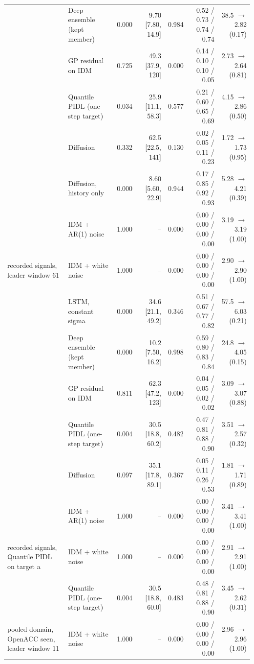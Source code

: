 \begin{longtable}{llrrrrr}
 & Deep ensemble (kept member) & 0.000 & 9.70 [7.80, 14.9] & 0.984 & 0.52 / 0.73 / 0.74 / 0.74 & 38.5 $\rightarrow$ 2.82 (0.17) \\
 & GP residual on IDM & 0.725 & 49.3 [37.9, 120] & 0.000 & 0.14 / 0.10 / 0.10 / 0.05 & 2.73 $\rightarrow$ 2.64 (0.81) \\
 & Quantile PIDL (one-step target) & 0.034 & 25.9 [11.1, 58.3] & 0.577 & 0.21 / 0.60 / 0.65 / 0.69 & 4.15 $\rightarrow$ 2.86 (0.50) \\
 & Diffusion & 0.332 & 62.5 [22.5, 141] & 0.130 & 0.02 / 0.05 / 0.11 / 0.23 & 1.72 $\rightarrow$ 1.73 (0.95) \\
 & Diffusion, history only & 0.000 & 8.60 [5.60, 22.9] & 0.944 & 0.17 / 0.85 / 0.92 / 0.93 & 5.28 $\rightarrow$ 4.21 (0.39) \\
 & IDM + AR(1) noise & 1.000 & -- & 0.000 & 0.00 / 0.00 / 0.00 / 0.00 & 3.19 $\rightarrow$ 3.19 (1.00) \\
\midrule
recorded signals, leader window 61 & IDM + white noise & 1.000 & -- & 0.000 & 0.00 / 0.00 / 0.00 / 0.00 & 2.90 $\rightarrow$ 2.90 (1.00) \\
 & LSTM, constant sigma & 0.000 & 34.6 [21.1, 49.2] & 0.346 & 0.51 / 0.67 / 0.77 / 0.82 & 57.5 $\rightarrow$ 6.03 (0.21) \\
 & Deep ensemble (kept member) & 0.000 & 10.2 [7.50, 16.2] & 0.998 & 0.59 / 0.80 / 0.83 / 0.84 & 24.8 $\rightarrow$ 4.05 (0.15) \\
 & GP residual on IDM & 0.811 & 62.3 [47.2, 123] & 0.000 & 0.04 / 0.05 / 0.02 / 0.02 & 3.09 $\rightarrow$ 3.07 (0.88) \\
 & Quantile PIDL (one-step target) & 0.004 & 30.5 [18.8, 60.2] & 0.482 & 0.47 / 0.81 / 0.88 / 0.90 & 3.51 $\rightarrow$ 2.57 (0.32) \\
 & Diffusion & 0.097 & 35.1 [17.8, 89.1] & 0.367 & 0.05 / 0.11 / 0.26 / 0.53 & 1.81 $\rightarrow$ 1.71 (0.89) \\
 & IDM + AR(1) noise & 1.000 & -- & 0.000 & 0.00 / 0.00 / 0.00 / 0.00 & 3.41 $\rightarrow$ 3.41 (1.00) \\
\midrule
recorded signals, Quantile PIDL on target a & IDM + white noise & 1.000 & -- & 0.000 & 0.00 / 0.00 / 0.00 / 0.00 & 2.91 $\rightarrow$ 2.91 (1.00) \\
 & Quantile PIDL (one-step target) & 0.004 & 30.5 [18.8, 60.0] & 0.483 & 0.48 / 0.81 / 0.88 / 0.90 & 3.45 $\rightarrow$ 2.62 (0.31) \\
\midrule
pooled domain, OpenACC seen, leader window 11 & IDM + white noise & 1.000 & -- & 0.000 & 0.00 / 0.00 / 0.00 / 0.00 & 2.96 $\rightarrow$ 2.96 (1.00) \\

\end{longtable}
